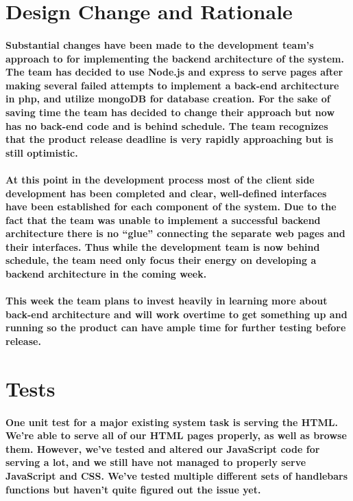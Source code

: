 \documentclass[12pt]{article}
\begin{document}
\begin{enumerate}
\begin{enumerate}
\begin{enumerate}
\begin{enumerate}
\section{\bf Design Change and Rationale}

  \paragraph{\normalfont \indent Substantial changes have been made to the development team’s approach to for implementing the backend architecture of the system. The team has decided to use Node.js and express to serve pages after making several failed attempts to implement a back-end architecture in php, and utilize mongoDB for database creation. For the sake of saving time the team has decided to change their approach but now has no back-end code and is behind schedule. The team recognizes that the product release deadline is very rapidly approaching but is still optimistic.
  }
  \paragraph{\normalfont \indent At this point in the development process most of the client side development has been completed and clear, well-defined interfaces have been established for each component of the system. Due to the fact that the team was unable to implement a successful backend architecture there is no “glue” connecting the separate web pages and their interfaces. Thus while the development team is now behind schedule, the team need only focus their energy on developing a backend architecture in the coming week.
  }
  \paragraph{\normalfont \indent This week the team plans to invest heavily in learning more about back-end architecture and will work overtime to get something up and running so the product can have ample time for further testing before release.
  }

\section{\bf Tests}

\paragraph{\normalfont \indent One unit test for a major existing system task is serving the HTML. We’re able to serve all of our HTML pages properly, as well as browse them. However, we’ve tested and altered our JavaScript code for serving a lot, and we still have not managed to properly serve JavaScript and CSS. We’ve tested multiple different sets of handlebars functions but haven’t quite figured out the issue yet.
}

\end{enumerate}
\end{enumerate}
\end{enumerate}
\end{enumerate}
\end{document}
